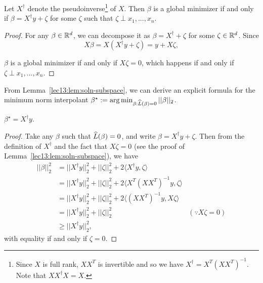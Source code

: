 \begin{lemma}\label{lec13:lem:soln-subspace}
Let $X^\dagger$ denote the pseudoinverse\footnote{Since $X$ is full rank, $XX^T$ is invertible and so we have $X^\dagger = X^T (X X^T)^{-1}$. Note that $X X^\dagger X = X$.} of $X$. Then $\beta$ is a global minimizer if and only if $\beta = X^\dagger y + \zeta$ for some $\zeta$ such that $\zeta \perp x_1,...,x_n$.
\end{lemma}

\begin{proof}
For any $\beta \in \mathbb R^d$, we can decompose it as $\beta = X^\dagger + \zeta$ for some $\zeta \in \mathbb R^d$. Since
\begin{equation}
X\beta = X (X^\dagger y + \zeta) = y + X\zeta,
\end{equation}

$\beta$ is a global minimizer if and only if $X\zeta = 0$, which happens if and only if $\zeta \perp x_1,...,x_n$.

\end{proof}

From Lemma~\ref{lec13:lem:soln-subspace}, we can derive an explicit formula for the minimum norm interpolant $\beta^\star := \arg \min_{\beta : \widehat{L}(\beta) = 0} ||\beta||_2$.
\begin{corollary}
$\beta^\star = X^\dagger y$.
\end{corollary}

\begin{proof}
Take any $\beta$ such that $\widehat{L}(\beta) = 0$, and write $\beta = X^\dagger y + \zeta$. Then from the definition of $X^\dagger$ and the fact that $X \zeta = 0$ (see the proof of Lemma~\ref{lec13:lem:soln-subspace}), we have 
\begin{align}
    ||\beta||_2^2 &= ||X^\dagger y||_2^2 + ||\zeta||_2^2 + 2 \langle X^\dagger y, \zeta \rangle \\
    &= ||X^\dagger y||_2^2 + ||\zeta||_2^2 + 2 \langle X^T(X X^T)^{-1} y, \zeta \rangle \\
    &= ||X^\dagger y||_2^2 + ||\zeta||_2^2 + 2 \langle (X X^T)^{-1} y, X \zeta \rangle \\
    &= ||X^\dagger y||_2^2 + ||\zeta||_2^2 &(\because X\zeta = 0) \\
    &\geq ||X^\dagger y||_2^2,
\end{align}
with equality if and only if $\zeta = 0$.

\end{proof}

